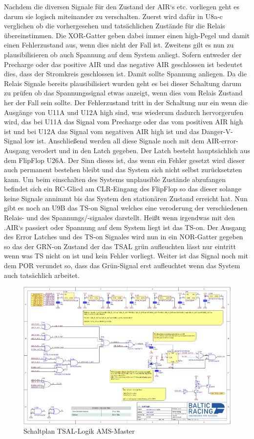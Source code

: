 Nachdem die diversen Signale für den Zustand der \ac{AIR}`s etc. vorliegen geht es darum sie logisch miteinander zu verschalten. Zuerst wird dafür in U8a-c verglichen ob die vorhergesehen und tatsächlichen Zustände für die Relais übereinstimmen. Die XOR-Gatter geben dabei immer einen high-Pegel und damit einen Fehlerzustand aus, wenn dies nicht der Fall ist. Zweitens gilt es nun zu plausibilisieren ob auch Spannung auf dem System anliegt. Sofern entweder der Precharge oder das positive \ac{AIR} und das negative \ac{AIR} geschlossen ist bedeutet dies, dass der Stromkreis geschlossen ist. Damit sollte Spannung anliegen. Da die Relais Signale bereits plausibilisiert wurden geht es bei dieser Schaltung darum zu prüfen ob das Spannungssignal etwas anzeigt, wenn dies vom Relais Zustand her der Fall sein sollte. Der Fehlerzustand tritt in der Schaltung nur ein wenn die Ausgänge von U11A und U12A high sind, was wiederum dadurch hervorgerufen wird, das bei U11A das Signal vom Precharge oder das vom positiven \ac{AIR} high ist und bei U12A das Signal vom negativen \ac{AIR} high ist und das Danger-V-Signal low ist. Anschließend werden all diese Signale noch mit dem \ac{AIR}-error-Ausgang verodert und in den Latch gegeben. Der Latch besteht hauptsächlich aus dem FlipFlop U26A. Der Sinn dieses ist, das wenn ein Fehler gesetzt wird dieser auch permanent bestehen bleibt und das System sich nicht selbst zurücksetzten kann. Um beim einschalten des Systems unplausible Zustände abzufangen befindet sich ein RC-Glied am CLR-Eingang des FlipFlop so das dieser solange keine Signale annimmt bis das System den stationären Zustand erreicht hat. Nun gibt es noch an U9B das \ac{TS}-on Signal welches eine veroderung der verschiedenen Relais- und des Spannungs/-signales darstellt. Heißt wenn irgendwas mit den .\ac{AIR}`s passiert oder Spannung auf dem System liegt ist das \ac{TS}-on. Der Ausgang des Error Latches und des \ac{TS}-on Signales wird nun in ein NOR-Gatter gegeben so das der GRN-on Zustand der das \ac{TSAL} grün aufleuchten lässt nur eintritt wenn was \ac{TS} nicht on ist und kein Fehler vorliegt. Weiter ist das Signal noch mit dem \ac{POR} verundet so, dass das Grün-Signal erst aufleuchtet wenn das System auch tatsächlich arbeitet.

\begin{figure}
	\centering
	\includegraphics[width=0.7\linewidth]{"bilder/TSAL Logik AMS Master"}
	\caption{Schaltplan \ac{TSAL}-Logik \ac{AMS}-Master}
	\label{fig:tsal-logik-ams-master}
\end{figure}

